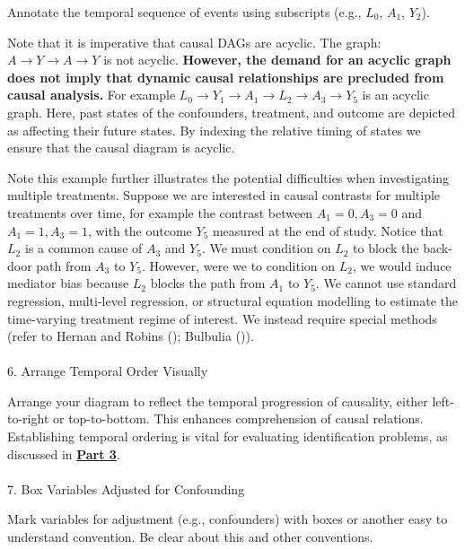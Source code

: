 \documentclass[
  singlecolumn]{article}
\makeatletter
\let\oldparagraph\paragraph
\renewcommand{\paragraph}{
    \@ifstar
      \xxxParagraphStar
      \xxxParagraphNoStar
  }
\newcommand{\xxxParagraphStar}[1]{\oldparagraph*{#1}\mbox{}}
\newcommand{\xxxParagraphNoStar}[1]{\oldparagraph{#1}\mbox{}}
\makeatother
\begin{document}
Annotate the temporal sequence of events using subscripts (e.g.,
\(L_0\), \(A_1\), \(Y_2\)).

Note that it is imperative that causal DAGs are acyclic. The graph:
\(A \to Y \to A \to Y\) is not acyclic. \textbf{However, the demand for
an acyclic graph does not imply that dynamic causal relationships are
precluded from causal analysis.} For example
\(L_0 \to Y_1 \to  A_1 \to L_2 \to A_3 \to Y_5\) is an acyclic graph.
Here, past states of the confounders, treatment, and outcome are
depicted as affecting their future states. By indexing the relative
timing of states we ensure that the causal diagram is acyclic.

Note this example further illustrates the potential difficulties when
investigating multiple treatments. Suppose we are interested in causal
contrasts for multiple treatments over time, for example the contrast
between \(A_1 = 0, A_3 = 0\) and \(A_1 = 1, A_3 = 1\), with the outcome
\(Y_5\) measured at the end of study. Notice that \(L_2\) is a common
cause of \(A_3\) and \(Y_5\). We must condition on \(L_2\) to block the
back-door path from \(A_3\) to \(Y_5\). However, were we to condition on
\(L_2\), we would induce mediator bias because \(L_2\) blocks the path
from \(A_1\) to \(Y_5\). We cannot use standard regression, multi-level
regression, or structural equation modelling to estimate the
time-varying treatment regime of interest. We instead require special
methods (refer to Hernan and Robins
(); Bulbulia
()).

\paragraph{6. Arrange Temporal Order
Visually}\label{arrange-temporal-order-visually}

Arrange your diagram to reflect the temporal progression of causality,
either left-to-right or top-to-bottom. This enhances comprehension of
causal relations. Establishing temporal ordering is vital for evaluating
identification problems, as discussed in
\hyperref[sec-part3]{\textbf{Part 3}}.

\paragraph{7. Box Variables Adjusted for
Confounding}\label{box-variables-adjusted-for-confounding}

Mark variables for adjustment (e.g., confounders) with boxes or another
easy to understand convention. Be clear about this and other
conventions.
\end{document}

